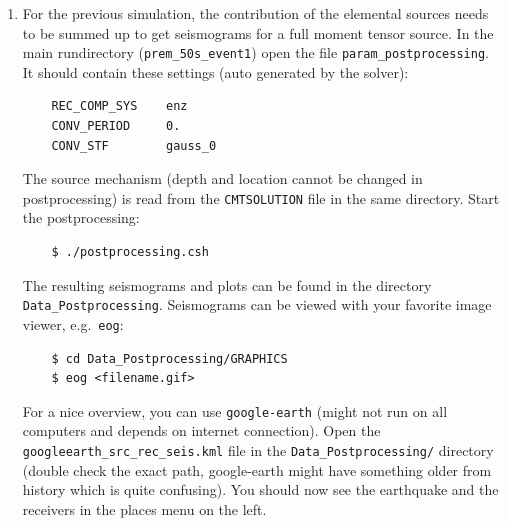\documentclass{article}
\begin{document}
\begin{enumerate}
    \item For the previous simulation, the contribution of the elemental sources needs
    to be summed up to get seismograms for a full moment tensor source. In the
    main rundirectory (\verb|prem_50s_event1|) open the file
    \verb|param_postprocessing|. It should contain these settings (auto generated by the
    solver):
    \begin{verbatim}
    REC_COMP_SYS    enz
    CONV_PERIOD     0.
    CONV_STF        gauss_0
    \end{verbatim}
    The source mechanism (depth and location cannot be changed in postprocessing) is read
    from the \verb|CMTSOLUTION| file in the same directory. Start the postprocessing:
    \begin{verbatim}
    $ ./postprocessing.csh
    \end{verbatim}
    The resulting seismograms and plots can be found in the directory
    \verb|Data_Postprocessing|. Seismograms can be viewed with your favorite image viewer,
    e.g.\ \verb|eog|:
    \begin{verbatim}
    $ cd Data_Postprocessing/GRAPHICS
    $ eog <filename.gif>
    \end{verbatim}
    For a nice overview, you can use \verb|google-earth| (might not run on all computers
    and depends on internet connection). Open the \verb|googleearth_src_rec_seis.kml| file
    in the \verb|Data_Postprocessing/| directory (double check the exact path,
    google-earth might have something older from history which is quite confusing).
    You should now see the earthquake and the receivers in the places menu on the left.


\end{enumerate}
\end{document}
